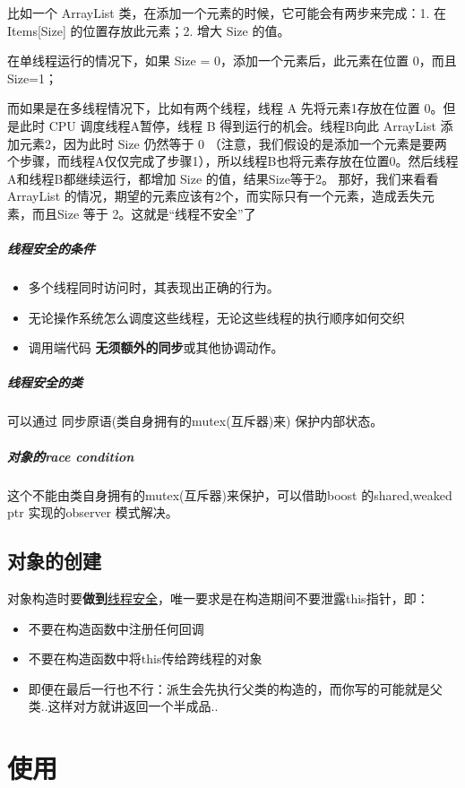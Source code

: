 \documentclass[UTF8,a4paper,12pt]{ctexbook}
\begin{document}
		比如一个 ArrayList 类，在添加一个元素的时候，它可能会有两步来完成：1. 在 Items[Size] 的位置存放此元素；2. 增大 Size 的值。
		
		在单线程运行的情况下，如果 Size = 0，添加一个元素后，此元素在位置 0，而且 Size=1；
		
		而如果是在多线程情况下，比如有两个线程，线程 A 先将元素1存放在位置 0。但是此时 CPU 调度线程A暂停，线程 B 得到运行的机会。线程B向此 ArrayList 添加元素2，因为此时 Size 仍然等于 0 （注意，我们假设的是添加一个元素是要两个步骤，而线程A仅仅完成了步骤1），所以线程B也将元素存放在位置0。然后线程A和线程B都继续运行，都增加 Size 的值，结果Size等于2。
		那好，我们来看看 ArrayList 的情况，期望的元素应该有2个，而实际只有一个元素，造成丢失元素，而且Size 等于 2。这就是“线程不安全”了
		\subparagraph{线程安全的条件}
			\begin{itemize}
				\item 多个线程同时访问时，其表现出正确的行为。
				\item 无论操作系统怎么调度这些线程，无论这些线程的执行顺序如何交织
				\item 调用端代码 \textbf{无须额外的同步}或其他协调动作。
			\end{itemize}
		\subparagraph{线程安全的类}可以通过 同步原语(类自身拥有的mutex(互斥器)来) 保护内部状态。
		\subparagraph{对象的race condition}这个不能由类自身拥有的mutex(互斥器)来保护，可以借助boost 的shared,weaked ptr 实现的observer 模式解决。
		
		\subsection{对象的创建}
			对象构造时要\textbf{做到}\underline{线程安全}，唯一要求是在构造期间不要泄露this指针，即：
				\begin{itemize}
					\item 不要在构造函数中注册任何回调
					\item 不要在构造函数中将this传给跨线程的对象
					\item 即便在最后一行也不行：派生会先执行父类的构造的，而你写的可能就是父类..这样对方就讲返回一个半成品..
				\end{itemize}
		
\section{使用}
\end{document}
